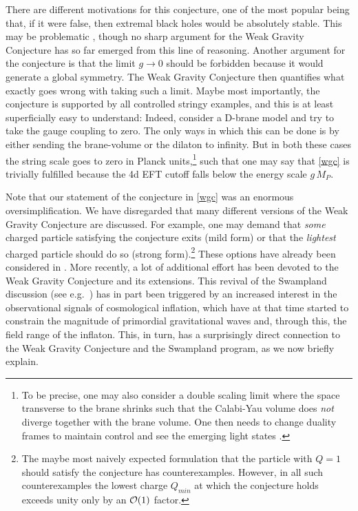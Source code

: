 \documentclass[12pt]{article}
\numberwithin{equation}{section}
\begin{document}
There are different motivations for this conjecture, one of the most popular being that, if it were false, then extremal black holes would be absolutely stable. This may be problematic \cite{Susskind:1995da}, though no sharp argument for the Weak Gravity Conjecture has so far emerged from this line of reasoning. Another argument for the conjecture is that the limit $g\to 0$ should be forbidden because it would generate a global symmetry. The Weak Gravity Conjecture then quantifies what exactly goes wrong with taking such a limit. Maybe most importantly, the conjecture is supported by all controlled stringy examples, and this is at least superficially easy to understand: Indeed, consider a D-brane model and try to take the gauge coupling to zero. The only ways in which this can be done is by either sending the brane-volume or the dilaton to infinity. But in both these cases the string scale goes to zero in Planck units,\footnote{
To be precise, one may also consider a double scaling limit where the space transverse to the brane shrinks such that the Calabi-Yau volume does {\it not} diverge together with the brane volume. One then needs to change duality frames to maintain control and see the emerging light states \cite{Lee:2018urn}.
} 
such that one may say that \eqref{wgc} is trivially fulfilled because the 4d EFT cutoff falls below the energy scale $g\, M_P$.

Note that our statement of the conjecture in \eqref{wgc} was an enormous oversimplification. We have disregarded that many different versions of the Weak Gravity Conjecture are discussed. For example, one may demand that {\it some} charged particle satisfying the conjecture exits (mild form) or that the {\it lightest} charged particle should do so (strong form).\footnote{
The 
maybe most naively expected formulation that the particle with $Q=1$ should satisfy the conjecture has counterexamples. However, in all such counterexamples the lowest charge $Q_{min}$ at which the conjecture holds exceeds unity only by an ${\cal O}(1)$ factor.
}
These options have already been considered in \cite{ArkaniHamed:2006dz}. More recently, a lot of additional effort has been devoted to the Weak Gravity Conjecture and its extensions. This revival of the Swampland discussion (see e.g.~\cite{Cheung:2014vva, delaFuente:2014aca, Rudelius:2015xta, Montero:2015ofa, Brown:2015iha, Bachlechner:2015qja, Hebecker:2015rya, Junghans:2015hba, Heidenreich:2015wga}) has in part been triggered by an increased interest in the observational signals of cosmological inflation, which have at that time started to constrain the magnitude of primordial gravitational waves and, through this, the field range of the inflaton. This, in turn, has a surprisingly direct connection to the Weak Gravity Conjecture and the Swampland program, as we now briefly explain.
\end{document}
